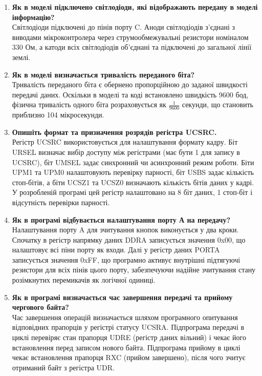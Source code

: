 \documentclass[14pt, a4paper]{extreport}
\begin{document}
\begin{enumerate}
		\item \textbf{Як в моделі підключено світлодіоди, які відображають передану в моделі інформацію?} \\ Світлодіоди підключені до пінів порту C. Аноди світлодіодів з'єднані з виводами мікроконтролера через струмообмежувальні резистори номіналом 330 Ом, а катоди всіх світлодіодів об'єднані та підключені до загальної лінії землі.
		
		\item \textbf{Як в моделі визначається тривалість переданого біта?} \\ Тривалість переданого біта є обернено пропорційною до заданої швидкості передачі даних. Оскільки в моделі та коді встановлено швидкість 9600 бод, фізична тривалість одного біта розраховується як $\frac{1}{9600}$ секунди, що становить приблизно 104 мікросекунди.
		
		\item \textbf{Опишіть формат та призначення розрядів регістра UCSRC.} \\ Регістр UCSRC використовується для налаштування формату кадру. Біт URSEL визначає вибір доступу між регістрами (має бути 1 для запису в UCSRC), біт UMSEL задає синхронний чи асинхронний режим роботи. Біти UPM1 та UPM0 налаштовують перевірку парності, біт USBS задає кількість стоп-бітів, а біти UCSZ1 та UCSZ0 визначають кількість бітів даних у кадрі. У розробленій програмі цей регістр налаштовано на 8 біт даних, 1 стоп-біт і відсутність перевірки парності.
		
		\item \textbf{Як в програмі відбувається налаштування порту А на передачу?} \\ Налаштування порту A для зчитування кнопок виконується у два кроки. Спочатку в регістр напрямку даних DDRA записується значення 0x00, що налаштовує всі піни порту як входи. Далі у регістр даних PORTA записується значення 0xFF, що програмно активує внутрішні підтягуючі резистори для всіх пінів цього порту, забезпечуючи надійне зчитування стану розімкнутих перемикачів як логічної одиниці.
		
		\item \textbf{Як в програмі визначається час завершення передачі та прийому чергового байта?} \\ Час завершення операцій визначається шляхом програмного опитування відповідних прапорців у регістрі статусу UCSRA. Підпрограма передачі в циклі перевіряє стан прапорця UDRE (регістр даних вільний) і чекає його встановлення перед записом нового байта. Підпрограма прийому в циклі чекає встановлення прапорця RXC (прийом завершено), після чого зчитує отриманий байт з регістра UDR.
		

\end{enumerate}
\end{document}
